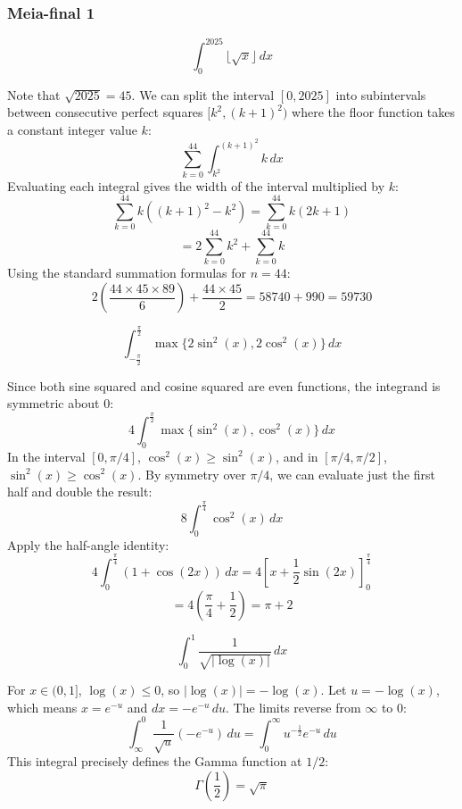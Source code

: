 \subsubsection*{Meia-final 1}
\begin{questions}
    \question \[ \int_0^{2025} \lfloor \sqrt{x} \rfloor \,dx \]
    \begin{solution}
        Note that $\sqrt{2025} = 45$. We can split the interval $[0, 2025]$ into subintervals between consecutive perfect squares $[k^2, (k+1)^2)$ where the floor function takes a constant integer value $k$:
        \[ \sum_{k=0}^{44} \int_{k^2}^{(k+1)^2} k \,dx \]
        Evaluating each integral gives the width of the interval multiplied by $k$:
        \[ \sum_{k=0}^{44} k \left( (k+1)^2 - k^2 \right) = \sum_{k=0}^{44} k(2k + 1) \]
        \[ = 2\sum_{k=0}^{44} k^2 + \sum_{k=0}^{44} k \]
        Using the standard summation formulas for $n = 44$:
        \[ 2 \left( \frac{44 \times 45 \times 89}{6} \right) + \frac{44 \times 45}{2} = 58740 + 990 = 59730 \]
    \end{solution}

    \question \[ \int_{-\frac{\pi}{2}}^{\frac{\pi}{2}} \max \{ 2\sin^2(x), 2\cos^2(x) \} \,dx \]
    \begin{solution}
        Since both sine squared and cosine squared are even functions, the integrand is symmetric about $0$:
        \[ 4 \int_0^{\frac{\pi}{2}} \max \{ \sin^2(x), \cos^2(x) \} \,dx \]
        In the interval $[0, \pi/4]$, $\cos^2(x) \geq \sin^2(x)$, and in $[\pi/4, \pi/2]$, $\sin^2(x) \geq \cos^2(x)$. By symmetry over $\pi/4$, we can evaluate just the first half and double the result:
        \[ 8 \int_0^{\frac{\pi}{4}} \cos^2(x) \,dx \]
        Apply the half-angle identity:
        \[ 4 \int_0^{\frac{\pi}{4}} (1 + \cos(2x)) \,dx = 4 \left[ x + \frac{1}{2}\sin(2x) \right]_0^{\frac{\pi}{4}} \]
        \[ = 4 \left( \frac{\pi}{4} + \frac{1}{2} \right) = \pi + 2 \]
    \end{solution}

    \question \[ \int_0^1 \frac{1}{\sqrt{|\log(x)|}} \,dx \]
    \begin{solution}
        For $x \in (0, 1]$, $\log(x) \leq 0$, so $|\log(x)| = -\log(x)$. Let $u = -\log(x)$, which means $x = e^{-u}$ and $dx = -e^{-u} \,du$. The limits reverse from $\infty$ to $0$:
        \[ \int_\infty^0 \frac{1}{\sqrt{u}} (-e^{-u}) \,du = \int_0^\infty u^{-\frac{1}{2}} e^{-u} \,du \]
        This integral precisely defines the Gamma function at $1/2$:
        \[ \Gamma\left(\frac{1}{2}\right) = \sqrt{\pi} \]
    \end{solution}


\end{questions}
